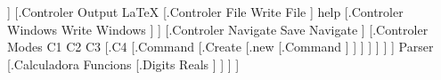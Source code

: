 \documentclass[border=2]{standalone}
\begin{document}
\Tree [.Main [.{Controler Central}
%
	[.Altres
		[.{Controler Input}
			[.{Controler Key} {Read Key} ]
			[.{Controler File} {Read File} ]
		]
%
		[.{Controler Output}
			{\LaTeX} 
			[.{Controler File} {Write File} ]
			help
			[.{Controler Windows} {Write Windows} ]
		]
%
		[.{Controler Navigate}
			{Save Navigate}
		]
%
		[.{Controler Modes}
			C1
			C2
			C3
			[.C4 [.Command [.Create [.new [.Command ] ] ] ] ]
		]
	]
	Parser
	[.Calculadora
		Funcions
		[.Digits Reals ]
	]
] ]
\end{document}
